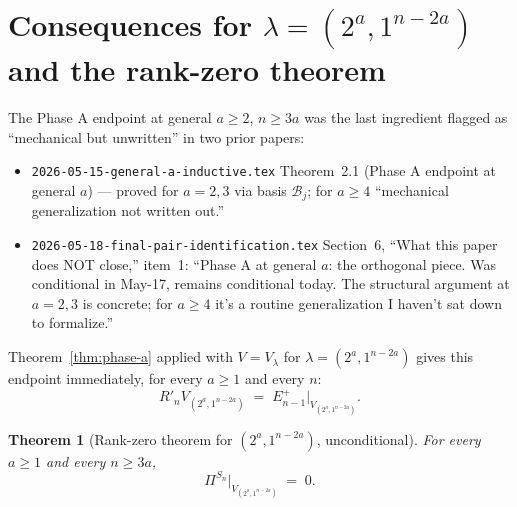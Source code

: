 \documentclass[11pt]{article}
\newtheorem{theorem}{Theorem}
\theoremstyle{definition}
\begin{document}
\section{Consequences for $\lambda = (2^a, 1^{n-2a})$ and the
rank-zero theorem}\label{sec:consequence}

The Phase A endpoint at general $a \ge 2$, $n \ge 3a$ was the last
ingredient flagged as ``mechanical but unwritten'' in two prior
papers:
\begin{itemize}[leftmargin=2em,topsep=0.3em,itemsep=0.2em]
\item \texttt{2026-05-15-general-a-inductive.tex} Theorem~2.1 (Phase
A endpoint at general $a$) --- proved for $a = 2, 3$ via basis
$\mathcal{B}_j$; for $a \ge 4$ ``mechanical generalization not
written out.''
\item \texttt{2026-05-18-final-pair-identification.tex} Section~6,
``What this paper does NOT close,'' item~1: ``Phase A at general
$a$: the orthogonal piece.  Was conditional in May-17, remains
conditional today.  The structural argument at $a = 2, 3$ is
concrete; for $a \ge 4$ it's a routine generalization I haven't sat
down to formalize.''
\end{itemize}
Theorem~\ref{thm:phase-a} applied with $V = V_\lambda$ for
$\lambda = (2^a, 1^{n-2a})$ gives this endpoint
immediately, for every $a \ge 1$ and every $n$:
\[
   R'_n V_{(2^a, 1^{n-2a})} \;=\; E_{n-1}^+\big|_{V_{(2^a, 1^{n-2a})}}.
\]

\begin{theorem}[Rank-zero theorem for $(2^a, 1^{n-2a})$,
unconditional]\label{thm:rank-zero-unconditional}
For every $a \ge 1$ and every $n \ge 3a$,
\[
   \Pi^{S_n}\big|_{V_{(2^a, 1^{n-2a})}} \;=\; 0.
\]
\end{theorem}
\end{document}
